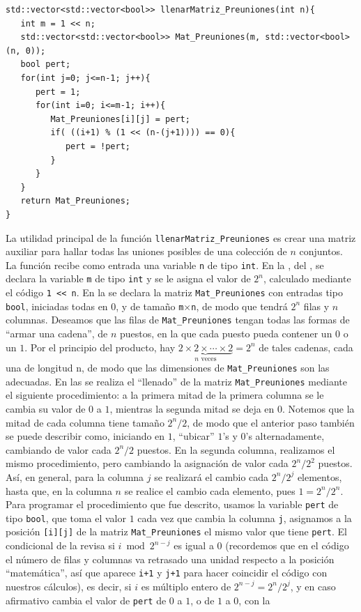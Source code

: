 \begin{lstlisting}[caption={Función \texttt{llenarMatriz\_Preuniones}}, label={cod:llenarMatriz_Preuniones}]
std::vector<std::vector<bool>> llenarMatriz_Preuniones(int n){
   int m = 1 << n;
   std::vector<std::vector<bool>> Mat_Preuniones(m, std::vector<bool>(n, 0));
   bool pert;
   for(int j=0; j<=n-1; j++){
      pert = 1;
      for(int i=0; i<=m-1; i++){
         Mat_Preuniones[i][j] = pert;
         if( ((i+1) % (1 << (n-(j+1)))) == 0){
            pert = !pert;
         }
      }
   }
   return Mat_Preuniones;
}
\end{lstlisting}
La utilidad principal de la función \texttt{llenarMatriz\_Preuniones} es crear una matriz auxiliar para hallar todas las uniones posibles de una colección de $n$ conjuntos. La función recibe como entrada una variable \texttt{n} de tipo \texttt{int}. En la , del , se declara la variable \texttt{m} de tipo \texttt{int} y se le asigna el valor de $2^n$, calculado mediante el código \texttt{1 \textless{}\textless{} n}. En la  se declara la matriz \texttt{Mat\_Preuniones} con entradas tipo \texttt{bool}, iniciadas todas en $0$, y de tamaño \texttt{m$\times$n}, de modo que tendrá $2^n$ filas y $n$ columnas. Deseamos que las filas de \texttt{Mat\_Preuniones} tengan todas las formas de ``armar una cadena'', de $n$ puestos, en la que cada puesto pueda contener un $0$ o un $1$. Por el principio del producto, hay $\underbrace{2\times 2\times \cdots \times 2}_{n \text{ veces}}=2^n$ de tales cadenas, cada una de longitud n, de modo que las dimensiones de \texttt{Mat\_Preuniones} son las adecuadas. En las  se realiza el ``llenado'' de la matriz \texttt{Mat\_Preuniones} mediante el siguiente procedimiento: a la primera mitad de la primera columna se le cambia su valor de $0$ a $1$, mientras la segunda mitad se deja en $0$. Notemos que la mitad de cada columna tiene tamaño $2^n/2$, de modo que el anterior paso también se puede describir como, iniciando en $1$, ``ubicar'' $1$'s y $0$'s alternadamente, cambiando de valor cada $2^n/2$ puestos. En la segunda columna, realizamos el mismo procedimiento, pero cambiando la asignación de valor cada $2^n/2^2$ puestos. Así, en general, para la columna $j$ se realizará el cambio cada $2^n/2^j$ elementos, hasta que, en la columna $n$ se realice el cambio cada elemento, pues $1=2^n/2^n$. Para programar el procedimiento que fue descrito, usamos la variable \texttt{pert} de tipo \texttt{bool}, que toma el valor $1$ cada vez que cambia la columna \texttt{j}, asignamos a la posición \texttt{[i][j]} de la matriz \texttt{Mat\_Preuniones} el mismo valor que tiene \texttt{pert}. El condicional de la  revisa si $i \bmod 2^{n-j}$ es igual a $0$ (recordemos que en el código el número de filas y columnas va retrasado una unidad respecto a la posición ``matemática'', así que aparece \texttt{i+1} y \texttt{j+1} para hacer coincidir el código con nuestros cálculos), es decir, si $i$ es múltiplo entero de $2^{n-j}=2^n/2^j$, y en caso afirmativo cambia el valor de \texttt{pert} de $0$ a $1$, o de $1$ a $0$, con la 